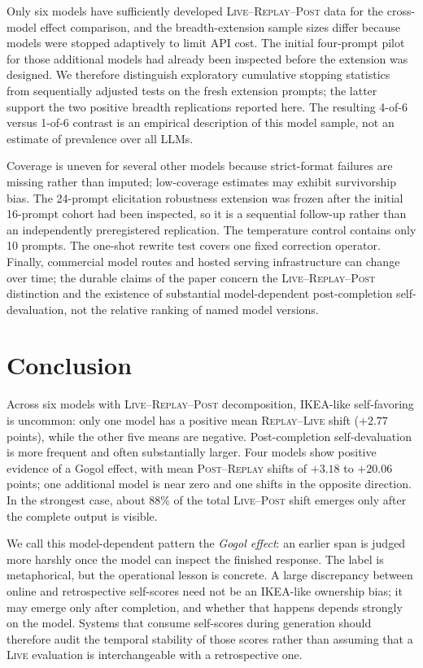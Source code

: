 \documentclass[10pt]{article}
\newcommand{\live}{\textsc{Live}}
\newcommand{\replay}{\textsc{Replay}}
\newcommand{\post}{\textsc{Post}}
\newcommand{\papersection}[1]{\Needspace{4.4\baselineskip}\section{#1}}
\begin{document}
Only six models have sufficiently developed \live{}--\replay{}--\post{} data for the cross-model effect comparison, and the breadth-extension sample sizes differ because models were stopped adaptively to limit API cost. The initial four-prompt pilot for those additional models had already been inspected before the extension was designed. We therefore distinguish exploratory cumulative stopping statistics from sequentially adjusted tests on the fresh extension prompts; the latter support the two positive breadth replications reported here. The resulting 4-of-6 versus 1-of-6 contrast is an empirical description of this model sample, not an estimate of prevalence over all LLMs.

Coverage is uneven for several other models because strict-format failures are missing rather than imputed; low-coverage estimates may exhibit survivorship bias. The 24-prompt elicitation robustness extension was frozen after the initial 16-prompt cohort had been inspected, so it is a sequential follow-up rather than an independently preregistered replication. The temperature control contains only 10 prompts. The one-shot rewrite test covers one fixed correction operator. Finally, commercial model routes and hosted serving infrastructure can change over time; the durable claims of the paper concern the \live{}--\replay{}--\post{} distinction and the existence of substantial model-dependent post-completion self-devaluation, not the relative ranking of named model versions.

\papersection{Conclusion}
Across six models with \live{}--\replay{}--\post{} decomposition, IKEA-like self-favoring is uncommon: only one model has a positive mean \replay{}--\live{} shift ($+2.77$ points), while the other five means are negative. Post-completion self-devaluation is more frequent and often substantially larger. Four models show positive evidence of a Gogol effect, with mean \post{}--\replay{} shifts of $+3.18$ to $+20.06$ points; one additional model is near zero and one shifts in the opposite direction. In the strongest case, about 88\% of the total \live{}--\post{} shift emerges only after the complete output is visible.

We call this model-dependent pattern the \emph{Gogol effect}: an earlier span is judged more harshly once the model can inspect the finished response. The label is metaphorical, but the operational lesson is concrete. A large discrepancy between online and retrospective self-scores need not be an IKEA-like ownership bias; it may emerge only after completion, and whether that happens depends strongly on the model. Systems that consume self-scores during generation should therefore audit the temporal stability of those scores rather than assuming that a \live{} evaluation is interchangeable with a retrospective one.
\end{document}
